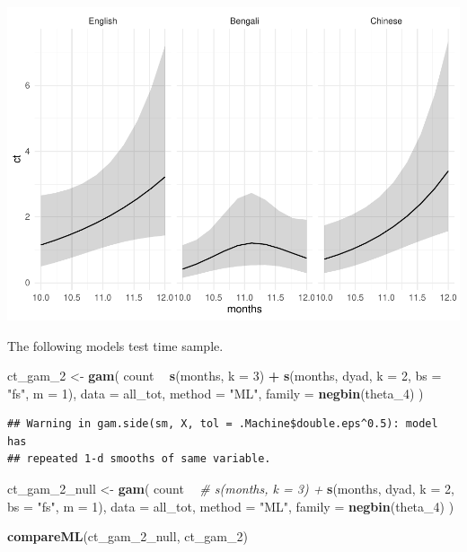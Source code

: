 \documentclass[]{article}
\newenvironment{Shaded}{\begin{snugshade}}{\end{snugshade}}
\newcommand{\CommentTok}[1]{\textcolor[rgb]{0.56,0.35,0.01}{\textit{#1}}}
\newcommand{\DataTypeTok}[1]{\textcolor[rgb]{0.13,0.29,0.53}{#1}}
\newcommand{\DecValTok}[1]{\textcolor[rgb]{0.00,0.00,0.81}{#1}}
\newcommand{\KeywordTok}[1]{\textcolor[rgb]{0.13,0.29,0.53}{\textbf{#1}}}
\newcommand{\NormalTok}[1]{#1}
\newcommand{\OperatorTok}[1]{\textcolor[rgb]{0.81,0.36,0.00}{\textbf{#1}}}
\newcommand{\StringTok}[1]{\textcolor[rgb]{0.31,0.60,0.02}{#1}}
\begin{document}
\includegraphics{supplement_files/figure-latex/ct-gam-plot-1.pdf}

The following models test time sample.

\begin{Shaded}
\begin{Highlighting}[]
\NormalTok{ct_gam_}\DecValTok{2}\NormalTok{ <-}\StringTok{ }\KeywordTok{gam}\NormalTok{(}
\NormalTok{  count }\OperatorTok{~}
\StringTok{    }\KeywordTok{s}\NormalTok{(months, }\DataTypeTok{k =} \DecValTok{3}\NormalTok{) }\OperatorTok{+}
\StringTok{    }\KeywordTok{s}\NormalTok{(months, dyad, }\DataTypeTok{k =} \DecValTok{2}\NormalTok{, }\DataTypeTok{bs =} \StringTok{"fs"}\NormalTok{, }\DataTypeTok{m =} \DecValTok{1}\NormalTok{),}
  \DataTypeTok{data =}\NormalTok{ all_tot,}
  \DataTypeTok{method =} \StringTok{"ML"}\NormalTok{,}
  \DataTypeTok{family =} \KeywordTok{negbin}\NormalTok{(theta_}\DecValTok{4}\NormalTok{)}
\NormalTok{)}
\end{Highlighting}
\end{Shaded}

\begin{verbatim}
## Warning in gam.side(sm, X, tol = .Machine$double.eps^0.5): model has
## repeated 1-d smooths of same variable.
\end{verbatim}

\begin{Shaded}
\begin{Highlighting}[]
\NormalTok{ct_gam_}\DecValTok{2}\NormalTok{_null <-}\StringTok{ }\KeywordTok{gam}\NormalTok{(}
\NormalTok{  count }\OperatorTok{~}
\StringTok{    }\CommentTok{# s(months, k = 3) +}
\StringTok{    }\KeywordTok{s}\NormalTok{(months, dyad, }\DataTypeTok{k =} \DecValTok{2}\NormalTok{, }\DataTypeTok{bs =} \StringTok{"fs"}\NormalTok{, }\DataTypeTok{m =} \DecValTok{1}\NormalTok{),}
  \DataTypeTok{data =}\NormalTok{ all_tot,}
  \DataTypeTok{method =} \StringTok{"ML"}\NormalTok{,}
  \DataTypeTok{family =} \KeywordTok{negbin}\NormalTok{(theta_}\DecValTok{4}\NormalTok{)}
\NormalTok{)}

\KeywordTok{compareML}\NormalTok{(ct_gam_}\DecValTok{2}\NormalTok{_null, ct_gam_}\DecValTok{2}\NormalTok{)}
\end{Highlighting}
\end{Shaded}
\end{document}
